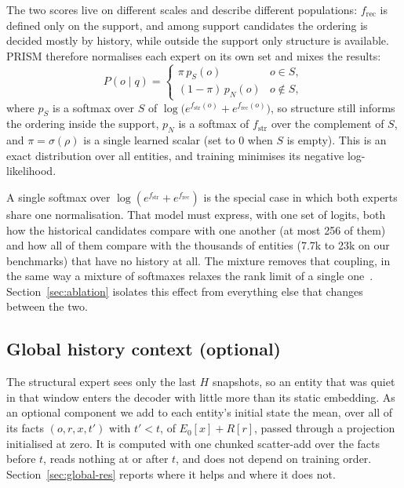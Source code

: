 \documentclass[conference]{IEEEtran}
\begin{document}
The two scores live on different scales and describe different populations:
$f_{\mathrm{rec}}$ is defined only on the support, and among support candidates
the ordering is decided mostly by history, while outside the support only
structure is available. PRISM therefore normalises each expert on its own set
and mixes the results:
\begin{equation}
P(o\mid q)=
\begin{cases}
\pi\, p_S(o) & o \in S,\\[2pt]
(1-\pi)\, p_N(o) & o \notin S,
\end{cases}
\end{equation}
where $p_S$ is a softmax over $S$ of
$\log\bigl(e^{f_{\mathrm{str}}(o)} + e^{f_{\mathrm{rec}}(o)}\bigr)$, so
structure still informs the ordering inside the support, $p_N$ is a softmax of
$f_{\mathrm{str}}$ over the complement of $S$, and $\pi = \sigma(\rho)$ is a
single learned scalar (set to $0$ when $S$ is empty). This is an exact distribution over all entities, and
training minimises its negative log-likelihood.

A single softmax over $\log(e^{f_{\mathrm{str}}}+e^{f_{\mathrm{rec}}})$ is the
special case in which both experts share one normalisation. That model must
express, with one set of logits, both how the historical candidates compare
with one another (at most 256 of them) and how all of them compare with the
thousands of entities (7.7k to 23k on our benchmarks) that have no history at
all. The mixture removes that coupling, in the same way
a mixture of softmaxes relaxes the rank limit of a single one~\cite{mos}.
Section~\ref{sec:ablation} isolates this effect from everything else that
changes between the two.

\subsection{Global history context (optional)}
\label{sec:global}

The structural expert sees only the last $H$ snapshots, so an entity that was
quiet in that window enters the decoder with little more than its static
embedding. As an optional component we add to each entity's initial state the
mean, over all of its facts $(o,r,x,t')$ with $t'<t$, of $E_0[x]+R[r]$, passed
through a projection initialised at zero. It is computed with one chunked
scatter-add over the facts before $t$, reads nothing at or after $t$, and does
not depend on training order. Section~\ref{sec:global-res} reports where it
helps and where it does not.
\end{document}
